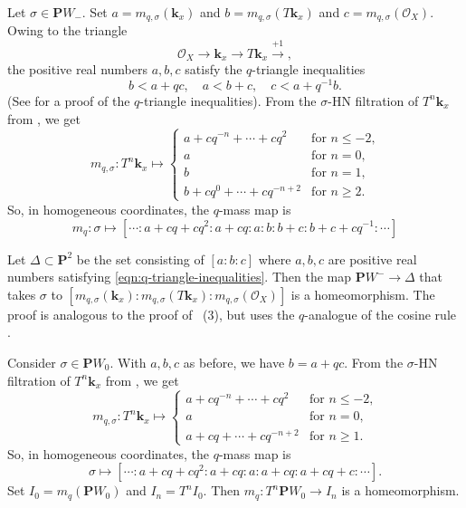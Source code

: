 \documentclass{amsart}
\begin{document}
Let \(\sigma \in \mathbf{P}W_-\).
Set \(a = m_{q,\sigma}(\mathbf{k}_x)\) and \(b = m_{q,\sigma}(T\mathbf{k}_x)\) and \(c = m_{q,\sigma}(\mathcal{O}_X)\).
Owing to the triangle 
\[ \mathcal{O}_X \to \mathbf{k}_x \to T\mathbf{k}_x \xrightarrow{+1},\]
the positive real numbers \(a,b,c\) satisfy the \(q\)-triangle inequalities 
\begin{equation}\label{eqn:q-triangle-inequalities}
  b < a + qc, \quad a < b + c, \quad c < a + q^{-1}b.
\end{equation}
(See \cite[Proposition~3.3]{ike:21} for a proof of the \(q\)-triangle inequalities).
From the \(\sigma\)-HN filtration of \(T^n\mathbf{k}_x\) from , we get
\[ m_{q, \sigma} \colon T^n \mathbf{k}_x \mapsto
  \begin{cases}
    a + cq^{-n}+ \cdots + c q^{2} &\text{for \(n \leq -2\),}\\
    a &\text{for \(n = 0\),}\\
    b & \text{for \(n = 1\),}\\
    b + c q^0 + \cdots + c q^{-n+2} & \text{for \(n \geq 2\)}.
  \end{cases}
\]
So, in homogeneous coordinates, the \(q\)-mass map is
\[ m_q \colon \sigma \mapsto [ \cdots :a + cq+cq^2 : a + cq :a: b: b + c : b + c + c q^{-1} : \cdots ]\]

Let \(\Delta \subset \mathbf{P}^2\) be the set consisting of \([a:b:c]\) where \(a,b,c\) are positive real numbers satisfying \eqref{eqn:q-triangle-inequalities}.
Then the map \( \mathbf{P} W^- \to \Delta\)
that takes \(\sigma\) to \([m_{q,\sigma}(\mathbf{k}_x):m_{q,\sigma}(T\mathbf{k}_x): m_{q,\sigma}(\mathcal{O}_X)]\)
is a homeomorphism.
The proof is analogous to the proof of ~(3), but uses the \(q\)-analogue of the cosine rule \cite[Lemma~5.2]{bap.bec.lic:22}.

Consider \(\sigma \in \mathbf{P}W_0\).
With \(a,b,c\) as before, we have \(b = a + qc\).
From the \(\sigma\)-HN filtration of \(T^n\mathbf{k}_x\) from , we get
\[ m_{q, \sigma} \colon T^n \mathbf{k}_x \mapsto
  \begin{cases}
    a + cq^{-n}+ \cdots + c q^{2} &\text{for \(n \leq -2\),}\\
    a &\text{for \(n = 0\),}\\
    a + cq + \cdots + c q^{-n+2} & \text{for \(n \geq 1\)}.
  \end{cases}
\]
So, in homogeneous coordinates, the \(q\)-mass map is
\[ \sigma \mapsto [ \cdots :a + cq+cq^2 : a + cq :a: a+cq: a + cq + c: \cdots ].\]
Set \(I_{0} = m_q(\mathbf{P}W_0)\) and \(I_n = T^nI_0\).
Then \(m_q \colon T^n \mathbf{P}W_0 \to I_n\) is a homeomorphism.
\end{document}

